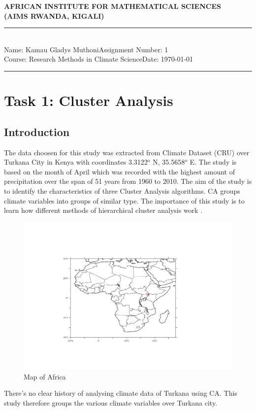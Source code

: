 \documentclass[12pt,a4paper]{article}
\newcommand{\student}{Kamau Gladys Muthoni}
\newcommand{\course}{Research Methods in Climate Science}
\newcommand{\assignment}{1}
\begin{document}
\thispagestyle{empty}
\begin{center}
\textbf{AFRICAN INSTITUTE FOR MATHEMATICAL SCIENCES \\[0.5cm]
(AIMS RWANDA, KIGALI)}
\vspace{1.0cm}
\end{center}

\noindent
\rule{17cm}{0.2cm}\\[0.3cm]
Name: \student \hfill Assignment Number: \assignment\\[0.1cm]
Course: \course \hfill Date: \today\\
\rule{17cm}{0.05cm}
\vspace{1.0cm}
\tableofcontents
\section{Task 1: Cluster Analysis}
\subsection{Introduction}
The data choosen for this study was extracted from Climate Dataset (CRU) over Turkana City in Kenya with coordinates 3.3122$^\text{o}$ N, 35.5658$^\text{o}$ E. 
The study is based on the month of April which was recorded with the highest amount of precipitation over the span of 51 years from 1960 to 2010. The aim of the study is to identify the characteristics of three Cluster Analysis algorithms. CA groups climate variables into groups of similar type. The importance of this study is to learn how different methods of hierarchical cluster analysis work \cite{vermunt2002latent}. 

\begin{figure}[h]
	\centering
	\includegraphics[width=0.8\linewidth, height=0.6\textheight]{Turkana}
	\caption{Map of Africa}
	\label{fig:turkana}
\end{figure}
\noindent There's no clear history of analysing climate data of Turkana using CA. This study therefore groups the various climate variables over Turkana city.\\
\end{document}
